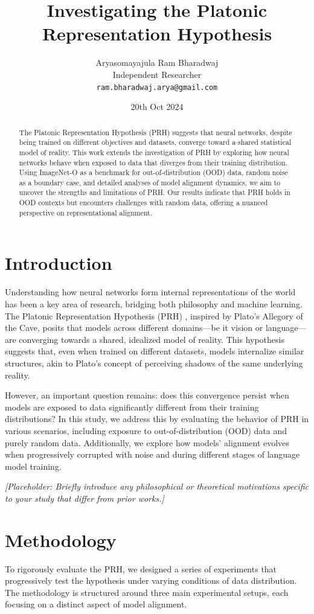 \documentclass[10pt,a4paper]{article}
\title{Investigating the Platonic Representation Hypothesis}
\author{Aryasomayajula Ram Bharadwaj\\
Independent Researcher\\
\texttt{ram.bharadwaj.arya@gmail.com}}
\date{20th Oct 2024}
\begin{document}
\maketitle

\begin{abstract}
The Platonic Representation Hypothesis (PRH) \cite{huh2024prh} suggests that neural networks, despite being trained on different objectives and datasets, converge toward a shared statistical model of reality. This work extends the investigation of PRH by exploring how neural networks behave when exposed to data that diverges from their training distribution. Using ImageNet-O as a benchmark for out-of-distribution (OOD) data, random noise as a boundary case, and detailed analyses of model alignment dynamics, we aim to uncover the strengths and limitations of PRH. Our results indicate that PRH holds in OOD contexts but encounters challenges with random data, offering a nuanced perspective on representational alignment.
\end{abstract}

\section{Introduction}
Understanding how neural networks form internal representations of the world has been a key area of research, bridging both philosophy and machine learning. The Platonic Representation Hypothesis (PRH) \cite{huh2024prh}, inspired by Plato’s Allegory of the Cave, posits that models across different domains—be it vision or language—are converging towards a shared, idealized model of reality. This hypothesis suggests that, even when trained on different datasets, models internalize similar structures, akin to Plato’s concept of perceiving shadows of the same underlying reality.

However, an important question remains: does this convergence persist when models are exposed to data significantly different from their training distributions? In this study, we address this by evaluating the behavior of PRH in various scenarios, including exposure to out-of-distribution (OOD) data and purely random data. Additionally, we explore how models' alignment evolves when progressively corrupted with noise and during different stages of language model training.

\textit{[Placeholder: Briefly introduce any philosophical or theoretical motivations specific to your study that differ from prior works.]}

\section{Methodology}
To rigorously evaluate the PRH, we designed a series of experiments that progressively test the hypothesis under varying conditions of data distribution. The methodology is structured around three main experimental setups, each focusing on a distinct aspect of model alignment.
\end{document}
